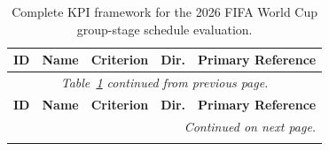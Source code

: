\documentclass[12pt, letterpaper]{article}
\begin{document}
\setlength{\LTpre}{8pt}
\setlength{\LTpost}{6pt}

\begin{longtable}{@{}p{0.9cm} p{4.6cm} p{2.8cm} p{1.2cm} p{4.0cm}@{}}
\caption{Complete KPI framework for the 2026 FIFA World Cup
         group-stage schedule evaluation.}
\label{tab:summary}\\
\toprule
\textbf{ID} & \textbf{Name} & \textbf{Criterion} &
\textbf{Dir.} & \textbf{Primary Reference} \\
\midrule
\endfirsthead
\multicolumn{5}{c}{\small\itshape Table~\ref{tab:summary}
  \textendash{} continued from previous page.} \\[4pt]
\toprule
\textbf{ID} & \textbf{Name} & \textbf{Criterion} &
\textbf{Dir.} & \textbf{Primary Reference} \\
\midrule
\endhead
\midrule
\multicolumn{5}{r}{\small\itshape Continued on next page.} \\
\endfoot
\bottomrule
\endlastfoot


\end{longtable}
\end{document}
